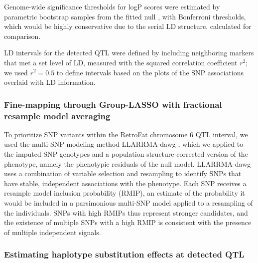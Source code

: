 Genome-wide significance thresholds for logP scores were estimated by parametric bootstrap samples from the fitted null \citep{Valdar2009,SolbergWoods2010}, with Bonferroni thresholds, which would be highly conservative due to the serial LD structure, calculated for comparison. 

LD intervals for the detected QTL were defined by including neighboring markers that met a set level of LD, measured with the squared correlation coefficient $r^{2}$; we used $r^{2}=0.5$ to define intervals based on the plots of the SNP associations overlaid with LD information.

\subsubsection{Fine-mapping through Group-LASSO with fractional resample model averaging}

To prioritize SNP variants within the RetroFat chromosome 6 QTL interval, we used the multi-SNP modeling method LLARRMA-dawg \citep{Sabourin2015}, which we applied to the imputed SNP genotypes and a population structure-corrected version of the phenotype, namely the phenotypic residuals of the null model. LLARRMA-dawg uses a combination of variable selection and resampling to identify SNPs that have stable, independent associations with the phenotype. Each SNP receives a resample model inclusion probability (RMIP), an estimate of the probability it would be included in a parsimonious multi-SNP model applied to a resampling of the individuals. SNPs with high RMIPs thus represent stronger candidates, and the existence of multiple SNPs with a high RMIP is consistent with the presence of multiple independent signals.

\subsubsection{Estimating haplotype substitution effects at detected QTL}

